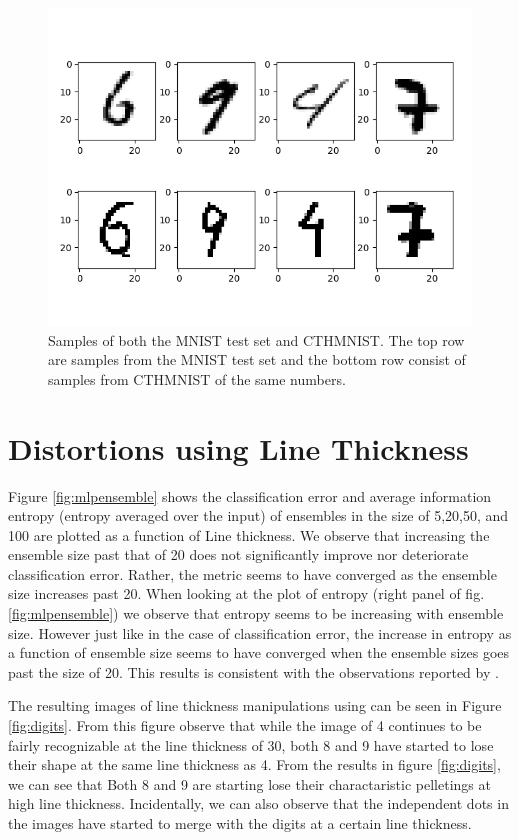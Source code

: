 \begin{figure}[h]
    \centering
    \includegraphics[scale=0.9]{figure/digitscompare.png}
    \caption{Samples of both the MNIST test set and CTHMNIST. The top row are samples from the MNIST test set and the bottom row consist of samples from CTHMNIST of the same numbers.}
    \label{fig:digitscomp}
\end{figure}
\newpage
\section{Distortions using Line Thickness}

Figure \ref{fig:mlpensemble} shows the classification error and average information entropy (entropy averaged over the input) of ensembles in the size of 5,20,50, and 100 are plotted as a function of Line thickness. We observe that increasing the ensemble size past that of 20 does not significantly improve nor deteriorate classification error. Rather, the metric seems to have converged as the ensemble size increases past 20. When looking at the plot of entropy (right panel of fig. \ref{fig:mlpensemble}) we observe that entropy seems to be increasing with ensemble size. However just like in the case of classification error, the increase in entropy as a function of ensemble size seems to have converged when the ensemble sizes goes past the size of 20. This results is consistent with the observations reported by \cite{lakshminarayanan2017simple}.

The resulting images of line thickness manipulations using \cite{kozielski2012moment} can be seen in Figure \ref{fig:digits}. From this figure observe that while the image of 4 continues to be fairly recognizable at the line thickness of 30, both 8 and 9 have started to lose their shape at the same line thickness as 4. From the results in figure \ref{fig:digits}, we can see that Both 8 and 9 are starting lose their charactaristic pelletings at high line thickness. Incidentally, we can also observe that the independent dots in the images have started to merge with the digits at a certain line thickness. 

